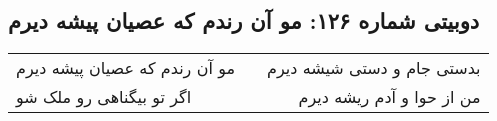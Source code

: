 \begin{center}
\section*{دوبیتی شماره ۱۲۶: مو آن رندم که عصیان پیشه دیرم}
\label{sec:126}
\begin{longtable}{l p{0.5cm} r}
مو آن رندم که عصیان پیشه دیرم
&&
بدستی جام و دستی شیشه دیرم
\\
اگر تو بیگناهی رو ملک شو
&&
من از حوا و آدم ریشه دیرم
\\
\end{longtable}
\end{center}
